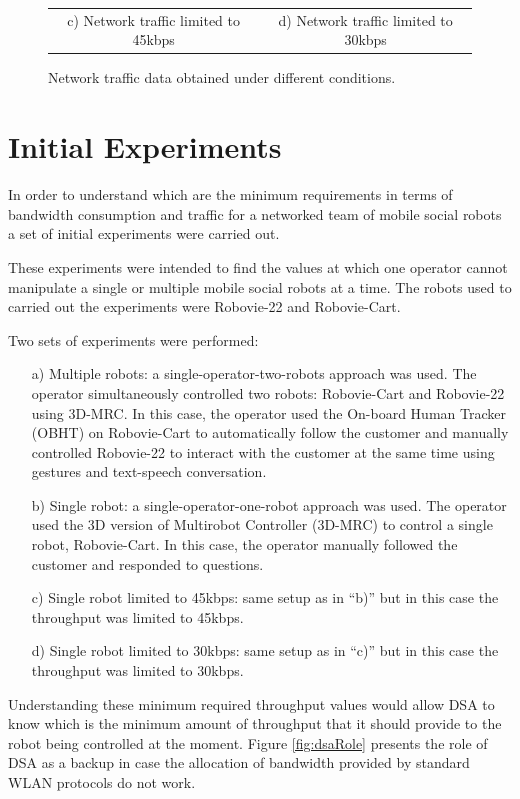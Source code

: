 \documentclass[conference]{ieeeconf}
\begin{document}
\begin{figure}[t]
\begin{tabular}{@{}cc@{}}
c) Network traffic limited to 45kbps &
d) Network traffic limited to 30kbps
\end{tabular}
\caption{{\Large Network traffic data obtained under different conditions.}}
\label{fig:expResults}
\end{figure}

\section{Initial Experiments}
In order to understand which are the minimum requirements in terms of bandwidth consumption and traffic for a networked team of mobile social robots a set of initial experiments were carried out.

These experiments were intended to find the values at which one operator cannot manipulate a single or multiple mobile social robots at a time.
The robots used to carried out the experiments were Robovie-22 and Robovie-Cart.

Two sets of experiments were performed: 
\begin{itemize}
  \item [a)] Multiple robots: a single-operator-two-robots approach was used. 
  The operator simultaneously controlled two robots: Robovie-Cart and Robovie-22 using 3D-MRC.
  In this case, the operator used the On-board Human Tracker (OBHT) on Robovie-Cart to automatically follow the customer and manually controlled Robovie-22 to interact with the customer at the same time using gestures and text-speech conversation. 
  
  \item [b)] Single robot: a single-operator-one-robot approach was used. 
  The operator used the 3D version of Multirobot Controller (3D-MRC) to control a single robot, Robovie-Cart.
  In this case, the operator manually followed the customer and responded to questions.
  
  \item [c)] Single robot limited to 45kbps: same setup as in ``b)'' but in this case the throughput was limited to 45kbps.
  
  \item [d)] Single robot limited to 30kbps: same setup as in ``c)'' but in this case the throughput was limited to 30kbps.
\end{itemize}

Understanding these minimum required throughput values would allow DSA to know which is the minimum amount of throughput that it should provide to the robot being controlled at the moment. 
Figure \ref{fig:dsaRole} presents the role of DSA as a backup in case the allocation of bandwidth provided by standard WLAN protocols do not work. 
\end{document}
